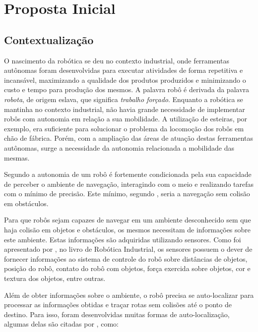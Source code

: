 
\chapter[Proposta Inicial]{Proposta Inicial}

\section{Contextualização}
	
	O nascimento da robótica se deu no contexto industrial, onde ferramentas autônomas foram desenvolvidas para executar atividades de forma repetitiva e incansável, maximizando a qualidade dos produtos produzidos e minimizando o custo e tempo para produção dos mesmos. A palavra robô é derivada da palavra \textit{robota}, de origem eslava, que significa \textit{trabalho forçado}. Enquanto a robótica se mantinha no contexto industrial, não havia grande necessidade de implementar robôs com autonomia em relação a sua mobilidade. A utilização de esteiras, por exemplo, era suficiente para solucionar o problema da locomoção dos robôs em chão de fábrica. Porém, com a ampliação das áreas de atuação destas ferramentas autônomas, surge a necessidade da autonomia relacionada a mobilidade das mesmas.

	Segundo \cite{localizacaoEMapeamentoPaulo} a autonomia de um robô é fortemente condicionada pela sua capacidade de perceber o ambiente de navegação, interagindo com o meio e realizando tarefas com o mínimo de precisão. Este mínimo, segundo \cite{localizacaoEMapeamentoPaulo}, seria a navegação sem colisão em obstáculos. 

	Para que robôs sejam capazes de navegar em um ambiente desconhecido sem que haja colisão em objetos e obstáculos, os mesmos necessitam de informações sobre este ambiente. Estas informações são adquiridas utilizando sensores. Como foi apresentado por \cite{interacaoRoboAmbiente}, no livro de Robótica Industrial, os sensores possuem o dever de fornecer informações ao sistema de controle do robô sobre distâncias de objetos, posição do robô, contato do robô com objetos, força exercida sobre objetos, cor e textura dos objetos, entre outras.

	Além de obter informações sobre o ambiente, o robô precisa se auto-localizar para processar as informações obtidas e traçar rotas sem colisões até o ponto de destino. Para isso, foram desenvolvidas muitas formas de auto-localização, algumas delas são citadas por \cite{roboBulldozerIV}, como:


